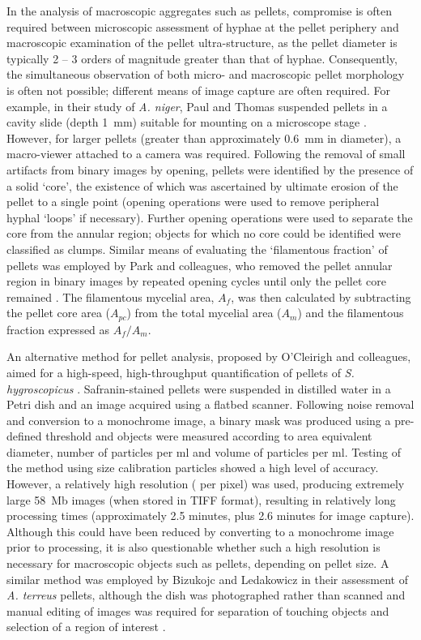 In the analysis of macroscopic aggregates such as pellets, compromise is often required between microscopic assessment of hyphae at the pellet periphery and macroscopic examination of the pellet ultra-structure, as the pellet diameter is typically 2 -- 3 orders of magnitude greater than that of hyphae. Consequently, the simultaneous observation of both micro- and macroscopic pellet morphology is often not possible; different means of image capture are often required. For example, in their study of \emph{A. niger}, Paul and Thomas suspended pellets in a cavity slide (depth 1~mm) suitable for mounting on a microscope stage \cite{paul1998}. However, for larger pellets (greater than approximately 0.6~mm in diameter), a macro-viewer attached to a camera was required. Following the removal of small artifacts from binary images by opening, pellets were identified by the presence of a solid \lq core', the existence of which was ascertained by ultimate erosion of the pellet to a single point (opening operations were used to remove peripheral hyphal \lq loops' if necessary). Further opening operations were used to separate the core from the annular region; objects for which no core could be identified were classified as clumps. Similar means of evaluating the \lq filamentous fraction' of pellets was employed by Park and colleagues, who removed the pellet annular region in binary images by repeated opening cycles until only the pellet core remained \cite{eypark2001}. The filamentous mycelial area, $A_f$, was then calculated by subtracting the pellet core area ($A_{pc}$) from the total mycelial area ($A_m$) and the filamentous fraction expressed as $A_f/A_m$.

An alternative method for pellet analysis, proposed by O'Cleirigh and colleagues, aimed for a high-speed, high-throughput quantification of pellets of \emph{S. hygroscopicus} \cite{ocleirigh2003}. Safranin-stained pellets were suspended in distilled water in a Petri dish and an image acquired using a flatbed scanner. Following noise removal and conversion to a monochrome image, a binary mask was produced using a pre-defined threshold and objects were measured according to area equivalent diameter, number of particles per ml and volume of particles per ml. Testing of the method using size calibration particles showed a high level of accuracy. However, a relatively high resolution ( per pixel) was used, producing extremely large 58~Mb images (when stored in TIFF format), resulting in relatively long processing times (approximately 2.5 minutes, plus 2.6 minutes for image capture). Although this could have been reduced by converting to a monochrome image prior to processing, it is also questionable whether such a high resolution is necessary for macroscopic objects such as pellets, depending on pellet size. A similar method was employed by Bizukojc and Ledakowicz in their assessment of \emph{A. terreus} pellets, although the dish was photographed rather than scanned and manual editing of images was required for separation of touching objects and selection of a region of interest \cite{bizukojc2009}.

